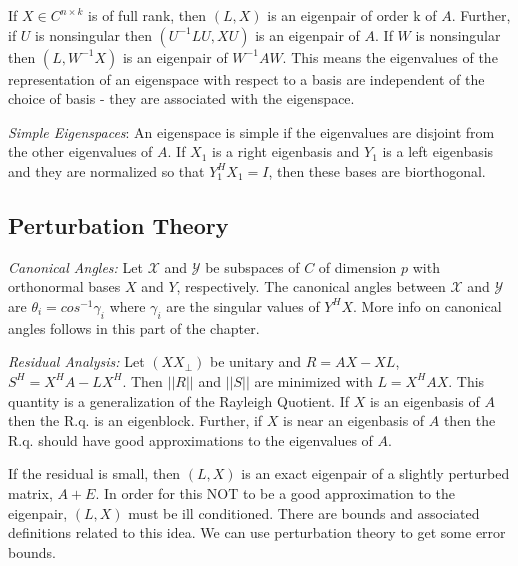 \documentclass[12pt,twoside]{article}
\newcommand{\evals}{eigenvalues }
\begin{document}
If $X \in C^{n \times k}$ is of full rank, then $(L,X)$ is an eigenpair of order k of $A$. Further, if $U$ is nonsingular then $(U^{-1}LU, XU)$ is an eigenpair of $A$. If $W$ is nonsingular then $(L, W^{-1}X)$ is an eigenpair of $W^{-1}AW$. This means the \evals of the representation of an eigenspace with respect to a basis are independent of the choice of basis - they are associated with the eigenspace. 

\emph{Simple Eigenspaces}: An eigenspace is simple if the \evals are disjoint from the other \evals of $A$. If $X_1$ is a right eigenbasis and $Y_1$ is a left eigenbasis and they are normalized so that $Y_1^HX_1 = I$, then these bases are biorthogonal. 

\subsection{Perturbation Theory}
\emph{Canonical Angles:} Let $\mathcal{X}$ and $\mathcal{Y}$ be subspaces of $C$ of dimension $p$ with orthonormal bases $X$ and $Y$, respectively. The canonical angles between $\mathcal{X}$ and $\mathcal{Y}$ are $\theta_i = cos^{-1}\gamma_i$ where $\gamma_i$ are the singular values of $Y^HX$. More info on canonical angles follows in this part of the chapter.

\emph{Residual Analysis:} Let $(X X_\perp)$ be unitary and $R = AX - XL$, $S^H = X^HA - LX^H$. Then $||R||$ and $||S||$ are minimized with $L = X^HAX$. This quantity is a generalization of the Rayleigh Quotient. If $X$ is an eigenbasis of $A$ then the R.q. is an eigenblock. Further, if $X$ is near an eigenbasis of $A$ then the R.q. should have good approximations to the \evals of $A$. 

If the residual is small, then $(L,X)$ is an exact eigenpair of a slightly perturbed matrix, $A+E$. In order for this NOT to be a good approximation to the eigenpair, $(L,X)$ must be ill conditioned. There are bounds and associated definitions related to this idea. We can use perturbation theory to get some error bounds. 
\end{document}
